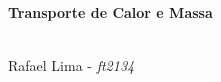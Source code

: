 \begin{center}
    \textbf{Transporte de Calor e Massa}
    \textbf{\\\tituloRelatorio \\}
\end{center}
 Rafael Lima - \textit{ft2134}\\


